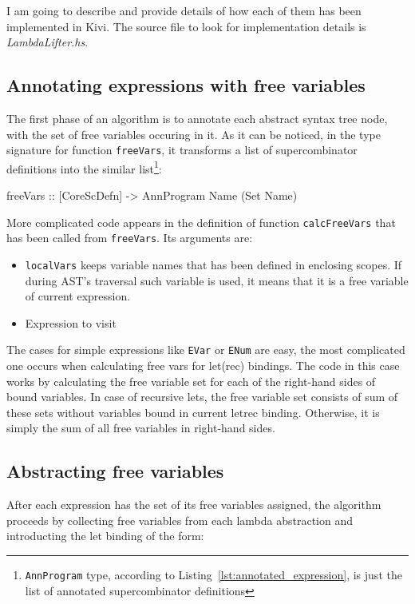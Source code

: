 \documentclass[12pt,a4paper]{report}
\begin{document}
I am going to describe and provide details of how each of them has been
implemented in Kivi. The source file to look for implementation details is
\textit{LambdaLifter.hs}.

\subsection{Annotating expressions with free variables}
The first phase of an algorithm is to annotate each abstract syntax tree
node, with the set of free variables occuring in it. As it can be noticed,
in the type signature for function \texttt{freeVars}, it transforms a list of
supercombinator definitions into the similar list\footnote{\texttt{AnnProgram}
type, according to Listing~\ref{lst:annotated_expression}, is just the list of
annotated supercombinator definitions}:

\vspace*{0.2in}
\begin{code}[style=haskell]
  freeVars :: [CoreScDefn] -> AnnProgram Name (Set Name)
\end{code}

More complicated code appears in the definition of function
\texttt{calcFreeVars} that has been called from \texttt{freeVars}. Its
arguments are:
\begin{itemize}
  \item \texttt{localVars} keeps variable names that has been defined in
    enclosing scopes. If during AST's traversal such variable is used, it
    means that it is a free variable of current expression.
  \item Expression to visit
\end{itemize}

The cases for simple expressions like \texttt{EVar} or \texttt{ENum} are easy,
the most complicated one occurs when calculating free vars for let(rec)
bindings. The code in this case works by calculating the free variable set for
each of the right-hand sides of bound variables. In case of recursive lets, the
free variable set consists of sum of these sets without variables bound in
current letrec binding. Otherwise, it is simply the sum of all free variables in
right-hand sides.

\subsection{Abstracting free variables}
After each expression has the set of its free variables assigned, the algorithm
proceeds by collecting free variables from each lambda abstraction and
introducting the let binding of the form:
\end{document}
